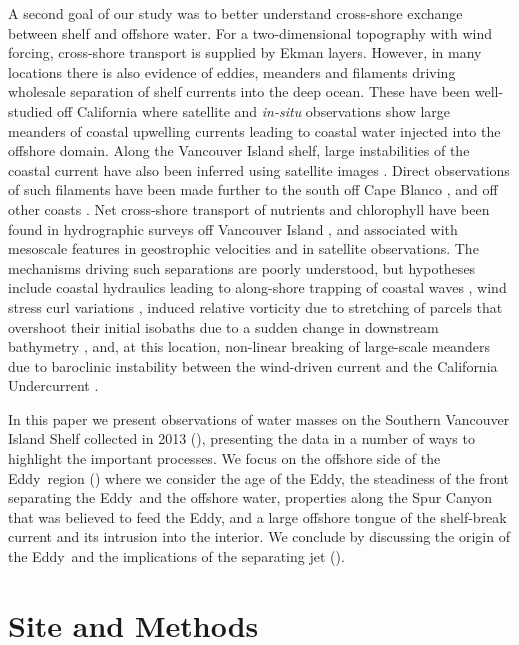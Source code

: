 \documentclass[draft]{agujournal2019}
\newcommand*{\Eddy}{{\sc Eddy}}
\begin{document}
A second goal of our study was to better understand cross-shore exchange between shelf and offshore water.  For a two-dimensional topography with wind forcing, cross-shore transport is supplied by Ekman layers. However, in many locations there is also evidence of eddies, meanders and filaments driving wholesale separation of shelf currents into the deep ocean. These have been well-studied off California \cite{strubetal91} where satellite and \emph{in-situ} observations show large meanders of coastal upwelling currents leading to coastal water injected into the offshore domain.   Along the Vancouver Island shelf, large instabilities of the coastal current have also been inferred using satellite images \cite{ikedaemery84,thomsongower98}.  Direct observations of such filaments have been made further to the south off Cape Blanco \cite{barthetal00}, and off other coasts \cite{relvasbarton05}. Net cross-shore transport of nutrients and chlorophyll have been found in hydrographic surveys off Vancouver Island \cite{mackasyelland99}, and associated with mesoscale features in geostrophic velocities and in satellite observations.  The mechanisms driving such separations are poorly understood, but hypotheses include coastal hydraulics leading to along-shore trapping of coastal waves \cite{dalebarth01},  wind stress curl variations \cite{castelaobarth07}, induced relative vorticity due to stretching of parcels that overshoot their initial isobaths due to a sudden change in downstream bathymetry \cite{dasaro88}, and, at this location, non-linear breaking of large-scale meanders due to baroclinic instability between the wind-driven current and the California Undercurrent \cite{ikedaetal84, batteen97}.

In this paper we present observations of water masses on the Southern Vancouver Island Shelf collected in 2013 (), presenting the data in a number of ways to highlight the important processes.  We focus on the offshore side of the \Eddy\ region () where we consider the age of the \Eddy, the steadiness of the front separating the \Eddy\ and the offshore water, properties along the Spur Canyon that was believed to feed the \Eddy, and a large offshore tongue of the shelf-break current and its intrusion into the interior.  We conclude by discussing the origin of the \Eddy\ and the implications of the separating jet ().

\section{Site and Methods}
\label{sec:Site}
\end{document}
